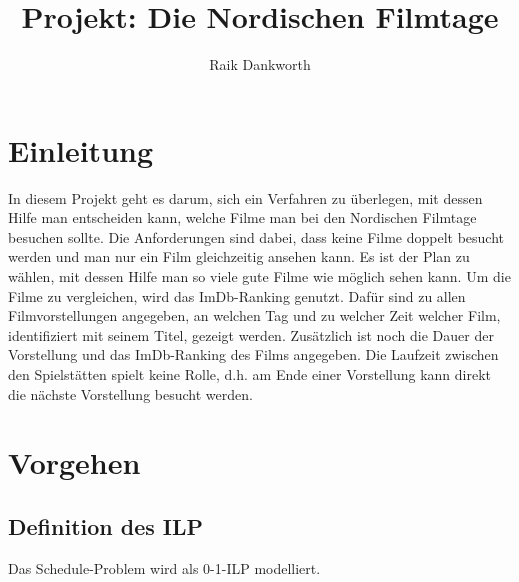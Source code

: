 \documentclass[a4paper, 12pt]{article}
\title{Projekt: Die Nordischen Filmtage}
\author{
    Raik Dankworth}
\date{}
\begin{document}
\maketitle

\section{Einleitung}

In diesem Projekt geht es darum, sich ein Verfahren zu überlegen, mit dessen Hilfe man entscheiden kann, welche Filme man bei den Nordischen Filmtage besuchen sollte.
Die Anforderungen sind dabei, dass keine Filme doppelt besucht werden und man nur ein Film gleichzeitig ansehen kann.
Es ist der Plan zu wählen, mit dessen Hilfe man so viele gute Filme wie möglich sehen kann.
Um die Filme zu vergleichen, wird das ImDb-Ranking genutzt.
Dafür sind zu allen Filmvorstellungen angegeben, an welchen Tag und zu welcher Zeit welcher Film, identifiziert mit seinem Titel, gezeigt werden. 
Zusätzlich ist noch die Dauer der Vorstellung und das ImDb-Ranking des Films angegeben.
Die Laufzeit zwischen den Spielstätten spielt keine Rolle, d.h. am Ende einer Vorstellung kann direkt die nächste Vorstellung besucht werden.

\section{Vorgehen}

\subsection{Definition des ILP}
Das Schedule-Problem wird als 0-1-ILP modelliert.
\end{document}
